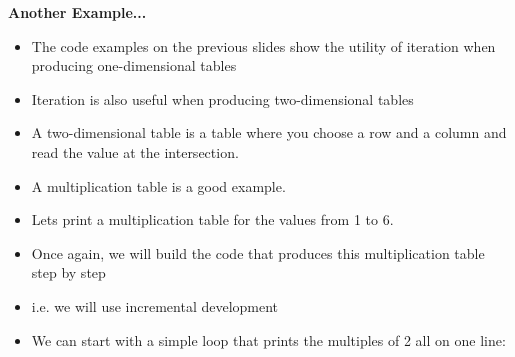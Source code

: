 \documentclass{beamer}
\begin{document}
%
%
%
%
%
%

 \begin{frame} 
 \begin{center}
 \textbf{Another Example...}
 \end{center}
 
\begin{itemize}
\item The code examples on the previous slides show the utility of iteration when producing one-dimensional tables
\item Iteration is also useful when producing two-dimensional tables
\item A two-dimensional table is a table where you choose a row and a column and read the value at the intersection.
\item A multiplication table is a good example.
\end{itemize}
 \end{frame}
 
 \begin{frame}
\begin{itemize}
\item Lets print a multiplication table for the values from 1 to 6. 
\item Once again, we will build the code that produces this multiplication table step by step
\item i.e. we will use incremental development
\end{itemize}

\begin{itemize}
\item We can start with a simple loop that prints the multiples of 2 all on one line:
\end{itemize}
 \end{frame}
 
\end{document}
